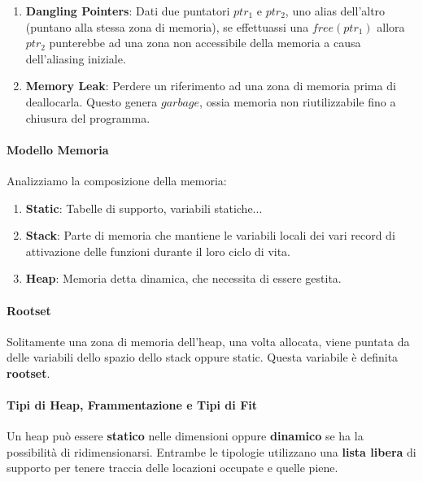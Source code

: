 \documentclass{article}
\begin{document}
\begin{enumerate}
    \item \textbf{Dangling Pointers}: Dati due puntatori $ptr_{1}$ e $ptr_{2}$, uno alias dell'altro (puntano alla stessa zona di memoria), se effettuassi una $free(ptr_{1})$ allora $ptr_{2}$ punterebbe ad una zona non accessibile della memoria a causa dell'aliasing iniziale.
    \item \textbf{Memory Leak}: Perdere un riferimento ad una zona di memoria prima di deallocarla. Questo genera $garbage$, ossia memoria non riutilizzabile fino a chiusura del programma.
\end{enumerate}

\vspace*{8px}

\paragraph{Modello Memoria} Analizziamo la composizione della memoria:

\begin{enumerate}
    \item \textbf{Static}: Tabelle di supporto, variabili statiche...
    \item \textbf{Stack}: Parte di memoria che mantiene le variabili locali dei vari record di attivazione delle funzioni durante il loro ciclo di vita.
    \item \textbf{Heap}: Memoria detta dinamica, che necessita di essere gestita.
\end{enumerate}

\vspace*{8px}

\paragraph{Rootset} Solitamente una zona di memoria dell'heap, una volta allocata, viene puntata da delle variabili dello spazio dello stack oppure static. Questa variabile è definita \textbf{rootset}.

\vspace*{8px}

\paragraph{Tipi di Heap, Frammentazione e Tipi di Fit}

Un heap può essere \textbf{statico} nelle dimensioni oppure \textbf{dinamico} se ha la possibilità di ridimensionarsi. Entrambe le tipologie utilizzano una \textbf{lista libera} di supporto per tenere traccia delle locazioni occupate e quelle piene.
\end{document}
